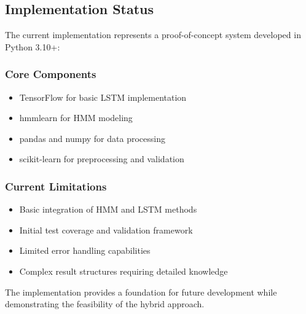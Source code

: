 \subsection{Implementation Status}
The current implementation represents a proof-of-concept system developed in Python 3.10+:

\subsubsection{Core Components}
\begin{itemize}
    \item TensorFlow for basic LSTM implementation
    \item hmmlearn for HMM modeling
    \item pandas and numpy for data processing
    \item scikit-learn for preprocessing and validation
\end{itemize}

\subsubsection{Current Limitations}
\begin{itemize}
    \item Basic integration of HMM and LSTM methods
    \item Initial test coverage and validation framework
    \item Limited error handling capabilities
    \item Complex result structures requiring detailed knowledge
\end{itemize}

The implementation provides a foundation for future development while demonstrating the feasibility of the hybrid approach.
